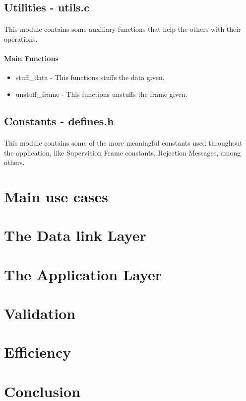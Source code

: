 \documentclass[11pt]{article}
\begin{document}
\subsection{Utilities - utils.c}

\paragraph{}This module contains some auxiliary functions that help the others with their operations.

\paragraph{Main Functions}

\begin{itemize}
        \item{stuff\_data - This functions stuffs the data given.}
        \item{unstuff\_frame - This functions unstuffs the frame given.}
\end{itemize}

\subsection{Constants - defines.h}

\paragraph{}This module contains some of the more meaningful constants used throughout the application, like Supervision Frame constants, Rejection Messages, among others.

\section{Main use cases}

\section{The Data link Layer}

\section{The Application Layer}

\section{Validation}

\section{Efficiency}

\section{Conclusion}
\end{document}
